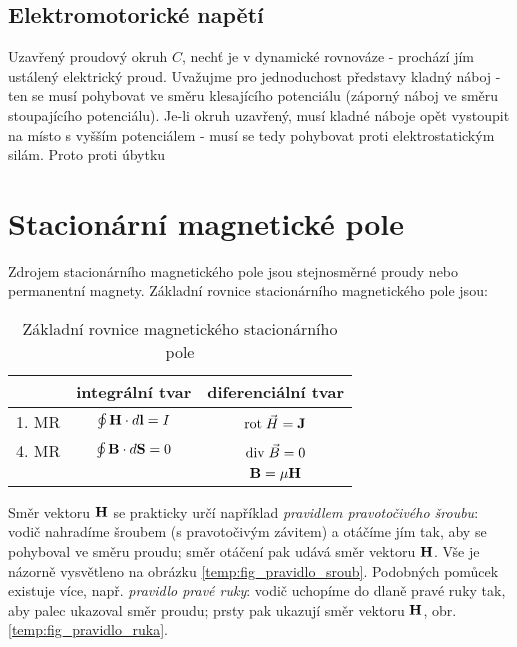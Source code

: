 {      %
        

    \subsection{Elektromotorické napětí}
      Uzavřený proudový okruh $C$, nechť je v dynamické rovnováze - prochází jím ustálený
      elektrický proud. Uvažujme pro jednoduchost představy kladný náboj - ten se musí pohybovat ve
      směru klesajícího potenciálu (záporný náboj ve směru stoupajícího potenciálu). Je-li okruh
      uzavřený, musí kladné náboje opět vystoupit na místo s vyšším potenciálem - musí se tedy
      pohybovat proti elektrostatickým silám. Proto proti úbytku      
               
  \newpage
  \section{Stacionární magnetické pole}
    Zdrojem stacionárního magnetického pole jsou stejnosměrné proudy nebo permanentní magnety.
    Základní rovnice stacionárního magnetického pole jsou:

    \begin{table}[ht!]
      \centering
      \begin{tabular}{lc|c|}
        \cline{2-3}
        \multicolumn{1}{l|}{} & \textbf{integrální tvar} & \textbf{diferenciální tvar} \\
        \hline
        \multicolumn{1}{|l|}{1. MR} & $\oint\mathbf{H}\cdot d\mathbf{l} = I$ & $\mathrm{rot}\;\vec{H} = \mathbf{J}$ \\ 
        \cline{1-3}
        \hline
        \multicolumn{1}{|l|}{4. MR} & $\oint\mathbf{B}\cdot d\mathbf{S} = 0$ & $\mathrm{div}\;\vec{B} = 0$ \\
        \cline{1-3}
        & & $\mathbf{B} = \mu \mathbf{H}$ \\
        \cline{3-3}
      \end{tabular}
      \caption{Základní rovnice magnetického stacionárního pole}
    \end{table}

    Směr vektoru $\mathbf{H}$ se prakticky určí například \emph{pravidlem pravotočivého šroubu}: vodič
    nahradíme šroubem (s pravotočivým závitem) a otáčíme jím tak, aby se pohyboval ve směru proudu;
    směr otáčení pak udává směr vektoru $\mathbf{H}$. Vše je názorně vysvětleno na obrázku
    \ref{temp:fig_pravidlo_sroub}. Podobných pomůcek existuje více, např. \emph{pravidlo pravé
    ruky}: vodič uchopíme do dlaně pravé ruky tak, aby palec ukazoval směr proudu; prsty pak
    ukazují směr vektoru $\mathbf{H}$, obr. \ref{temp:fig_pravidlo_ruka}.

}
